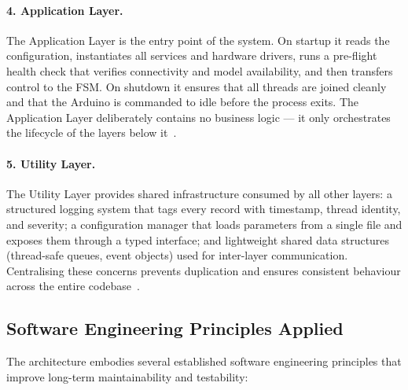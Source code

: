 \paragraph{4. Application Layer.}
The Application Layer is the entry point of the system. On startup it
reads the configuration, instantiates all services and hardware
drivers, runs a pre-flight health check that verifies connectivity and
model availability, and then transfers control to the FSM. On
shutdown it ensures that all threads are joined cleanly and that the
Arduino is commanded to idle before the process exits. The Application
Layer deliberately contains no business logic — it only orchestrates
the lifecycle of the layers below it~\cite{bass2021software}.
 
\paragraph{5. Utility Layer.}
The Utility Layer provides shared infrastructure consumed by all other
layers: a structured logging system that tags every record with
timestamp, thread identity, and severity; a configuration manager
that loads parameters from a single file and exposes them through a
typed interface; and lightweight shared data structures (thread-safe
queues, event objects) used for inter-layer communication. Centralising
these concerns prevents duplication and ensures consistent behaviour
across the entire codebase~\cite{martin2008clean}.
 
\subsection{Software Engineering Principles Applied}
 
The architecture embodies several established software engineering
principles that improve long-term maintainability and testability:
 
